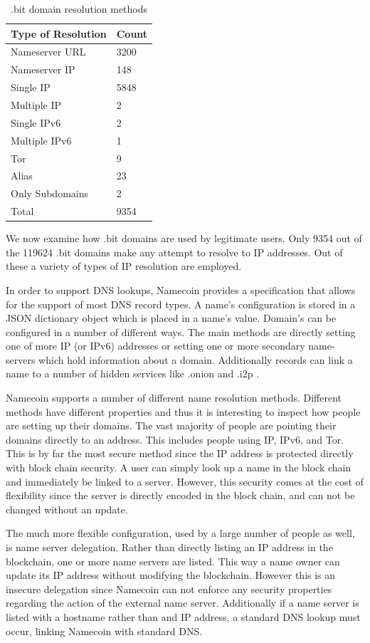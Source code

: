 \begin{table}[t]
\begin{tabular}{ll}
Type of Resolution & Count \\ \hline
Nameserver URL     & 3200  \\
Nameserver IP      & 148   \\
Single IP          & 5848  \\
Multiple IP        & 2     \\
Single IPv6        & 2     \\
Multiple IPv6      & 1     \\
Tor                & 9    \\
Alias              & 23    \\
Only Subdomains    & 2   \\ \hline
Total              & 9354
\end{tabular}
\caption{.bit domain resolution methods}
\end{table}

We now examine how .bit domains are used by legitimate users. Only 9354 out of the 119624 .bit domains make any attempt to resolve to IP addresses. Out of these a variety of types of IP resolution are employed.

In order to support DNS lookups, Namecoin provides a specification that allows for the support of most DNS record types. A name's configuration is stored in a JSON dictionary object which is placed in a name's value. Domain's can be configured in a number of different ways. The main methods are directly setting one of more IP (or IPv6) addresses or setting one or more secondary name-servers which hold information about a domain. Additionally records can link a name to a number of hidden services like .onion \cite{onion} and .i2p \cite{i2p}.

Namecoin supports a number of different name resolution methods. Different methods have different properties and thus it is interesting to inspect how people are setting up their domains. The vast majority of people are pointing their domains directly to an address. This includes people using IP, IPv6, and Tor. This is by far the most secure method since the IP address is protected directly with block chain security. A user can simply look up a name in the block chain and immediately be linked to a server. However, this security comes at the cost of flexibility since the server is directly encoded in the block chain, and can not be changed without an update.


The much more flexible configuration, used by a large number of people as well, is name server delegation. Rather than directly listing an IP address in the blockchain, one or more name servers are listed. This way a name owner can update its IP address without modifying the blockchain. However this is an insecure delegation since Namecoin can not enforce any security properties regarding the action of the external name server. Additionally if a name server is listed with a hostname rather than and IP address, a standard DNS lookup must occur, linking Namecoin with standard DNS.

